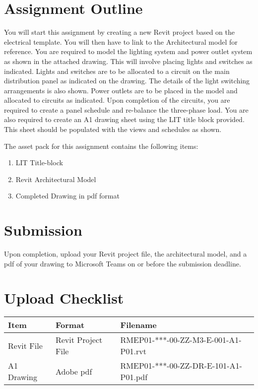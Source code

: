 \vspace{1cm}

\section*{Assignment Outline}
You will start this assignment by creating a new Revit project based on the electrical template. You will then have to link to the Architectural model for reference.
You are required to model the lighting system and power outlet system as shown in the attached drawing. This will involve placing lights and switches as indicated. Lights and switches are to be allocated to a circuit on the main distribution panel as indicated on the drawing. The details of the light switching arrangements is also shown.
Power outlets are to be placed in the model and allocated to circuits as indicated.
Upon completion of the circuits, you are required to create a panel schedule and re-balance the three-phase load.
You are also required to create an A1 drawing sheet using the LIT title block provided. This sheet should be populated with the views and schedules as shown.

The asset pack for this assignment contains the following items:
\begin{enumerate}
	\item LIT Title-block
	\item Revit Architectural Model
	\item Completed Drawing in pdf format
\end{enumerate}


\section*{Submission}
Upon completion, upload your Revit project file, the architectural model, and a pdf of your drawing to Microsoft Teams on or before the submission deadline.


\section*{Upload Checklist}

\begin{tabular}{|l|l|l|}
	\hline
	\textbf{Item} & \textbf{Format} & \textbf{Filename} \\
	\hline
	Revit File  & Revit Project File & RMEP01-***-00-ZZ-M3-E-001-A1-P01.rvt  \\
	A1 Drawing  & Adobe pdf & RMEP01-***-00-ZZ-DR-E-101-A1-P01.pdf  \\
	\hline
\end{tabular}


